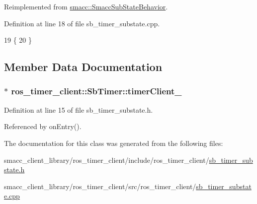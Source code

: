 Reimplemented from \hyperlink{classsmacc_1_1SmaccSubStateBehavior_afaeb44666136c5ae47a53dde89fa5d31}{smacc\+::\+Smacc\+Sub\+State\+Behavior}.



Definition at line 18 of file sb\+\_\+timer\+\_\+substate.\+cpp.


\begin{DoxyCode}
19 \{
20 \}
\end{DoxyCode}


\subsection{Member Data Documentation}
\subsubsection[{\texorpdfstring{timer\+Client\+\_\+}{timerClient_}}]{$\ast$ ros\+\_\+timer\+\_\+client\+::\+Sb\+Timer\+::timer\+Client\+\_\+\hspace{0.3cm}{\ttfamily [private]}}\hypertarget{classros__timer__client_1_1SbTimer_a7cd5504d7d46bbe2f547231b649002dd}{}\label{classros__timer__client_1_1SbTimer_a7cd5504d7d46bbe2f547231b649002dd}


Definition at line 15 of file sb\+\_\+timer\+\_\+substate.\+h.



Referenced by on\+Entry().



The documentation for this class was generated from the following files\+:\begin{DoxyCompactItemize}
\item 
smacc\+\_\+client\+\_\+library/ros\+\_\+timer\+\_\+client/include/ros\+\_\+timer\+\_\+client/\hyperlink{sb__timer__substate_8h}{sb\+\_\+timer\+\_\+substate.\+h}\item 
smacc\+\_\+client\+\_\+library/ros\+\_\+timer\+\_\+client/src/ros\+\_\+timer\+\_\+client/\hyperlink{sb__timer__substate_8cpp}{sb\+\_\+timer\+\_\+substate.\+cpp}\end{DoxyCompactItemize}
